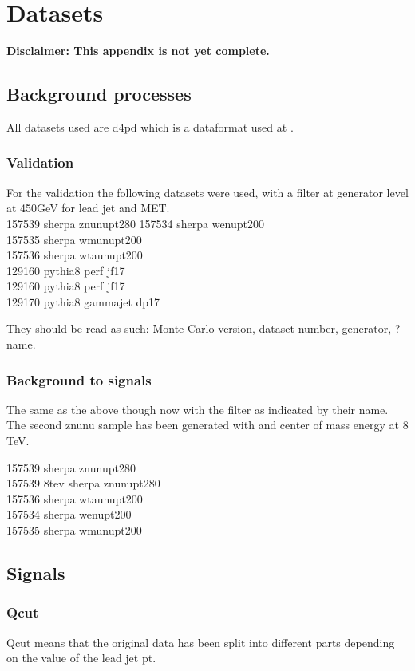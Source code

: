 \chapter{Datasets}\label{cha:datasets}
\textbf{Disclaimer: This appendix is not yet complete.}
\section{Background processes}
All datasets used are d4pd which is a dataformat used at \abbrCERN.
\subsection{Validation}
For the validation the following datasets were used, with a filter at generator level at 450GeV for lead jet and MET. \\
157539 sherpa  znunupt280
157534 sherpa    wenupt200\\
157535 sherpa    wmunupt200\\
157536 sherpa    wtaunupt200\\
129160 pythia8    perf  jf17\\
129160 pythia8    perf  jf17\\
129170 pythia8    gammajet  dp17

They should be read as such: Monte Carlo version, dataset number, generator, ? name.

\subsection{Background to signals}
The same as the above though now with the filter as indicated by their name. The second znunu sample has been generated with and center of mass energy at 8 TeV. 

157539 sherpa    znunupt280\\
157539 8tev  sherpa    znunupt280\\
157536 sherpa    wtaunupt200\\
157534 sherpa    wenupt200\\
157535 sherpa    wmunupt200
\section{Signals}
\subsection{Qcut}
Qcut means that the original data has been split into different parts depending on the value of the lead jet pt. 
